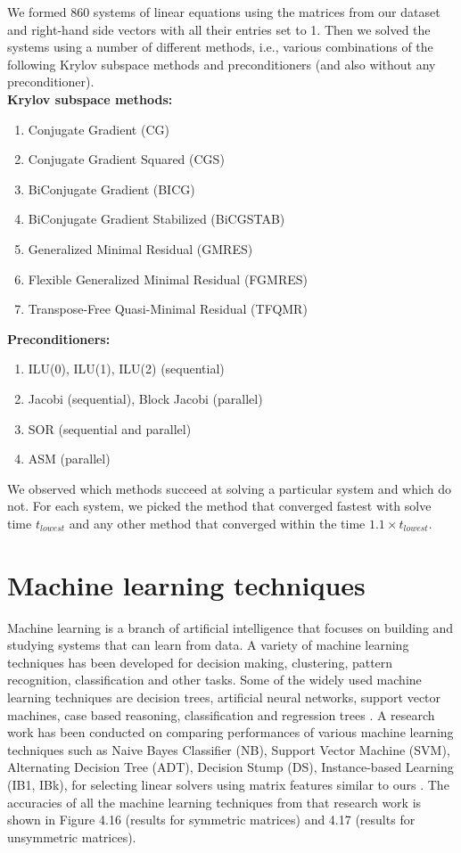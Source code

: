 We formed 860 systems of linear equations using the matrices from our dataset and right-hand side vectors with all their entries set to 1. Then we solved the systems using a number of different methods, i.e., various combinations of the following Krylov subspace methods and preconditioners (and also without any preconditioner).
\\
\textbf{Krylov subspace methods:}
\begin{enumerate}
  \item Conjugate Gradient (CG) \cite{cg}
  \item Conjugate Gradient Squared (CGS) \cite{cgs}
  \item BiConjugate Gradient (BICG) \cite{bicg}
  \item BiConjugate Gradient Stabilized (BiCGSTAB) \cite{bicgstab}
  \item Generalized Minimal Residual (GMRES) \cite{gmres}
  \item Flexible Generalized Minimal Residual (FGMRES) \cite{fgmres}
  \item Transpose-Free Quasi-Minimal Residual (TFQMR) \cite{tfqmr}
\end{enumerate}

\noindent \textbf{Preconditioners:}\cite{saadbook}
\begin{enumerate}
  \item ILU(0), ILU(1), ILU(2) (sequential)
  \item Jacobi (sequential), Block Jacobi (parallel)
  \item SOR (sequential and parallel)
  \item ASM (parallel)
\end{enumerate}

\noindent  We observed which methods succeed at solving a particular system and which do not. For each system, we picked the method that converged fastest with solve time $t_{lowest}$  and any other method that converged within the time $1.1 \times t_{lowest}$.

\section{Machine learning techniques}

Machine learning is a branch of artificial intelligence that focuses on building and studying systems that can learn from data. A variety of machine learning techniques has been 
developed for decision making, clustering, pattern recognition, classification and other tasks. Some of the widely used machine learning techniques are decision trees, artificial neural networks, support vector machines, case based reasoning, classification and regression trees \cite{singh}. A research work has been conducted on comparing performances of various machine learning techniques such as Naive Bayes Classifier (NB), Support Vector Machine (SVM), Alternating Decision Tree (ADT), Decision Stump (DS), Instance-based Learning (IB1, IBk), for selecting linear solvers using matrix features similar to ours \cite{brice}. The accuracies of all the machine learning techniques from that research work is shown in Figure 4.16 (results for symmetric matrices) and 4.17 (results for unsymmetric matrices).

